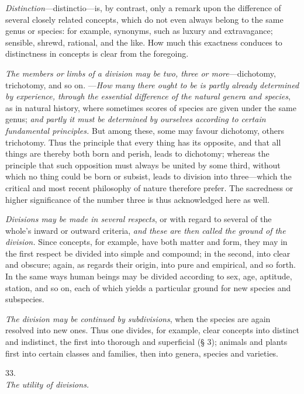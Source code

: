 \documentclass[12pt,a4paper]{article}
\newcommand{\logsec}[2]{%
  \bigskip\begin{center}{\large #1}\\[4pt]{\emph{#2}}\end{center}\smallskip}
\begin{document}
\emph{Distinction}---distinctio---is, by contrast, only a remark upon the
difference of several closely related concepts, which do not even always belong
to the same genus or species: for example, synonyms, such as luxury and
extravagance; sensible, shrewd, rational, and the like. How much this exactness
conduces to distinctness in concepts is clear from the foregoing.

\emph{The members or limbs of a division may be two, three or more}---dichotomy,
trichotomy, and so on.
---\emph{How many there ought to be is partly already determined by experience,
through the essential difference of the natural genera and species}, as in
natural history, where sometimes scores of species are given under the same
genus; \emph{and partly it must be determined by ourselves according to certain
fundamental principles.} But among these, some may favour dichotomy, others
trichotomy. Thus the principle that every thing has its opposite, and that all
things are thereby both born and perish, leads to dichotomy; whereas the
principle that such opposition must always be united by some third, without
which no thing could be born or subsist, leads to division into three---which
the critical and most recent philosophy of nature therefore prefer. The
sacredness or higher significance of the number three is thus acknowledged here
as well.

\emph{Divisions may be made in several respects}, or with regard to several of
the whole's inward or outward criteria, \emph{and these are then called the
ground of the division.} Since concepts, for example, have both matter and form,
they may in the first respect be divided into simple and compound; in the
second, into clear and obscure; again, as regards their origin, into pure and
empirical, and so forth. In the same ways human beings may be divided according
to sex, age, aptitude, station, and so on, each of which yields a particular
ground for new species and subspecies.

\emph{The division may be continued by subdivisions}, when the species are again
resolved into new ones. Thus one divides, for example, clear concepts into
distinct and indistinct, the first
into thorough and superficial (§ 3); animals and plants first into certain
classes and families, then into genera, species and varieties.

\logsec{33.}{The utility of divisions.}
\end{document}
